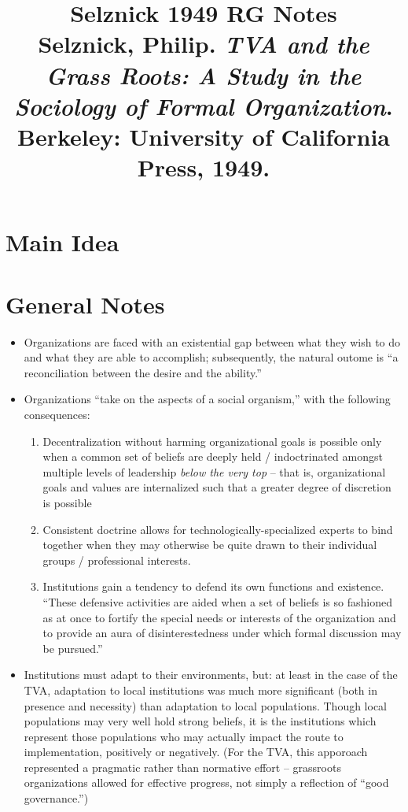 \documentclass[12pt]{article}
\title{\textbf{Selznick 1949 RG Notes}\\
\large Selznick, Philip. \textit{TVA and the Grass Roots: A Study in the Sociology of Formal Organization}.\\
Berkeley: University of California Press, 1949.}
\author{}
\date{}
\begin{document}
\maketitle

\section{Main Idea}



\section{General Notes}

\begin{itemize}[leftmargin=*, itemsep=4pt]
    \item Organizations are faced with an existential gap between what they wish to do and what they are able to accomplish; subsequently, the natural outome is ``a reconciliation between the desire and the ability.''
    \item Organizations ``take on the aspects of a social organism,'' with the following consequences:
    \begin{enumerate}
        \item Decentralization without harming organizational goals is possible only when a common set of beliefs are deeply held / indoctrinated amongst multiple levels of leadership \emph{below the very top} -- that is, organizational goals and values are internalized such that a greater degree of discretion is possible
        \item Consistent doctrine allows for technologically-specialized experts to bind together when they may otherwise be quite drawn to their individual groups / professional interests. 
        \item Institutions gain a tendency to defend its own functions and existence. ``These defensive activities are aided when a set of beliefs is so fashioned as at once to fortify the special needs or interests of the organization and to provide an aura of disinterestedness under which formal discussion may be pursued.''
    \end{enumerate}
    \item Institutions must adapt to their environments, but: at least in the case of the TVA, adaptation to local institutions was much more significant (both in presence and necessity) than adaptation to local populations. Though local populations may very well hold strong beliefs, it is the institutions which represent those populations who may actually impact the route to implementation, positively or negatively. (For the TVA, this apporoach represented a pragmatic rather than normative effort -- grassroots organizations allowed for effective progress, not simply a reflection of ``good governance.'')

\end{itemize}
\end{document}
